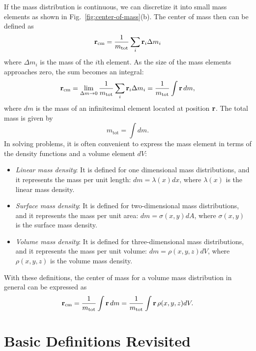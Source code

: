 \documentclass[12pt]{article}
\begin{document}
If the mass distribution is continuous, we can discretize it into small mass elements as shown in Fig.~\ref{fig:center-of-mass}(b). The center of mass then can be defined as
\[
    \vb{r}_{\text{cm}} = \frac{1}{m_{\text{tot}}}\sum_i \vb{r}_i\Delta{m_i}
\]
where $\Delta{m_i}$ is the mass of the $i$th element. As the size of the mass elements approaches zero, the sum becomes an integral:
\[
    \vb{r}_{\text{cm}} = \lim_{\Delta m \to 0} \frac{1}{m_{\text{tot}}}\sum_i \vb{r}_i\Delta{m_i}=\frac{1}{m_{\text{tot}}}\int \vb{r}\,dm,
\]
where $dm$ is the mass of an infinitesimal element located at position $\vb{r}$. The total mass is given by
\begin{equation}
    m_{\text{tot}} = \int dm.
\end{equation}
In solving problems, it is often convenient to express the mass element in terms of the density functions and a volume element $dV$:
\begin{itemize}
    \item \emph{Linear mass density}: It is defined for one dimensional mass distributions, and it represents the mass per unit length: $dm = \lambda(x)dx$, where $\lambda(x)$ is the linear mass density.
    \item \emph{Surface mass density}: It is defined for two-dimensional mass distributions, and it represents the mass per unit area: $dm = \sigma(x,y)dA$, where $\sigma(x,y)$ is the surface mass density.
    \item \emph{Volume mass density}: It is defined for three-dimensional mass distributions, and it represents the mass per unit volume: $dm = \rho(x,y,z)dV$, where $\rho(x,y,z)$ is the volume mass density.
\end{itemize}
With these definitions, the center of mass for a volume mass distribution in general can be expressed as
\begin{equation}
    \vb{r}_{\text{cm}} = \frac{1}{m_{\text{tot}}}\int \vb{r}\,dm = \frac{1}{m_{\text{tot}}}\int \vb{r}\,\rho(x,y,z)dV.
\end{equation}


\section{Basic Definitions Revisited}
\end{document}
